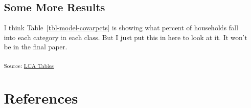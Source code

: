 \documentclass[
]{agujournal2019}
\begin{document}
\subsection{Some More Results}\label{some-more-results}

I think Table~\ref{tbl-model-covarpcts} is showing what percent of
households fall into each category in each class. But I just put this in
here to look at it. It won't be in the final paper.

\begin{table}

\caption{\label{tbl-model-covarpcts}The table that Katie gave me the
code to make.}

\centering{

}

\end{table}%

\textsubscript{Source:
\href{https://KamrynMansfield.github.io/transpo_budget_ces/notebooks/LCA-preview.html\#cell-tbl-model-covarpcts}{LCA
Tables}}

\section{References}\label{references}
\end{document}
